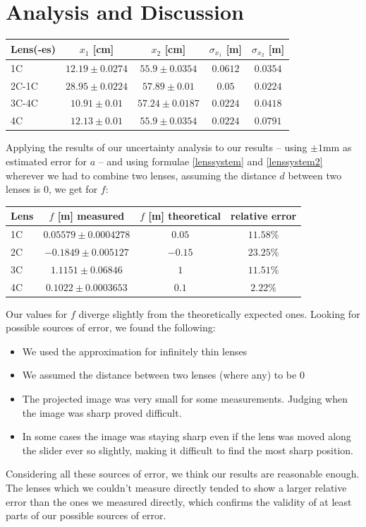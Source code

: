 \documentclass{scrreprt}
\begin{document}
\section{Analysis and Discussion}
\begin{table}[H]
\center
\begin{tabular}{|l|c|c|c|c|}
\hline
Lens(-es) & $x_1$ [cm] & $x_2$ [cm] & $\sigma_{x_1}$ [m] & $\sigma_{x_2}$ [m]\\
\hline
1C &$12.19 \pm 0.0274$&$55.9 \pm 0.0354$& $0.0612$ & $0.0354$\\
2C-1C &$28.95 \pm 0.0224$&$57.89 \pm 0.01$&$0.05$&$0.0224$\\
3C-4C &$10.91 \pm 0.01$&$57.24 \pm 0.0187$&$0.0224$&$0.0418$\\
4C &$12.13 \pm 0.01$&$55.9 \pm 0.0354$&$0.0224$&$0.0791$\\
\hline
\end{tabular}
\end{table}
Applying the results of our uncertainty analysis to our results -- using $\pm 1$mm as estimated error for $a$ -- and using formulae \ref{lenssystem} and \ref{lenssystem2} wherever we had to combine two lenses, assuming the distance $d$ between two lenses is $0$, we get for $f$:

\begin{table}[H]
\center
\begin{tabular}{|l|c|c|c|}
\hline
Lens & $f$ [m] measured & $f$ [m] theoretical & relative error\\
\hline
1C & $ 0.05579 \pm 0.0004278$&$0.05$&$11.58\%$\\
2C & $-0.1849 \pm 0.005127$&$-0.15$&$23.25\%$\\
3C & $ 1.1151 \pm 0.06846 $&$1$&$11.51\%$\\
4C & $0.1022 \pm 0.0003653$&$0.1$&$2.22\%$\\
\hline
\end{tabular}
\end{table} 
Our values for $f$ diverge slightly from the theoretically expected ones. Looking for possible sources of error, we found the following:
\begin{itemize}
\item We used the approximation for infinitely thin lenses
\item We assumed the distance between two lenses (where any) to be 0
\item The projected image was very small for some measurements. Judging when the image was sharp proved difficult.
\item In some cases the image was staying sharp even if the lens was moved along the slider ever so slightly, making it difficult to find the most sharp position.
\end{itemize}
Considering all these sources of error, we think our results are reasonable enough. The lenses which we couldn't measure directly tended to show a larger relative error than the ones we measured directly, which confirms the validity of at least parts of our possible sources of error.
\end{document}

